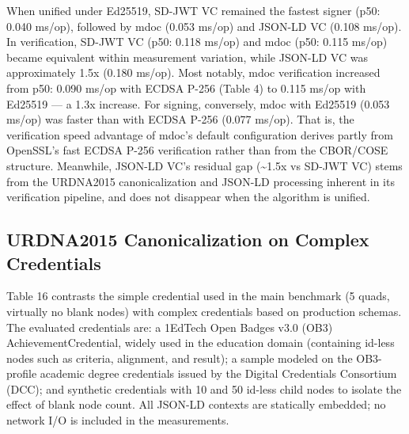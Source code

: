 \documentclass[conference]{IEEEtran}
\begin{document}
\begin{table}[!t]
\centering
\caption{Table 15. Ed25519-Unified Benchmark (all formats with same algorithm and attribute count; medians across N=2,000 $\times$ 5 runs)}\label{tab:15}
\footnotesize
{}
\end{table}

When unified under Ed25519, SD-JWT VC remained the fastest signer (p50: 0.040 ms/op), followed by mdoc (0.053 ms/op) and JSON-LD VC (0.108 ms/op). In verification, SD-JWT VC (p50: 0.118 ms/op) and mdoc (p50: 0.115 ms/op) became equivalent within measurement variation, while JSON-LD VC was approximately 1.5x (0.180 ms/op). Most notably, mdoc verification increased from p50: 0.090 ms/op with ECDSA P-256 (Table 4) to 0.115 ms/op with Ed25519 --- a 1.3x increase. For signing, conversely, mdoc with Ed25519 (0.053 ms/op) was faster than with ECDSA P-256 (0.077 ms/op). That is, the verification speed advantage of mdoc's default configuration derives partly from OpenSSL's fast ECDSA P-256 verification rather than from the CBOR/COSE structure. Meanwhile, JSON-LD VC's residual gap (\textasciitilde1.5x vs SD-JWT VC) stems from the URDNA2015 canonicalization and JSON-LD processing inherent in its verification pipeline, and does not disappear when the algorithm is unified.

\subsection{URDNA2015 Canonicalization on Complex Credentials}

Table 16 contrasts the simple credential used in the main benchmark (5 quads, virtually no blank nodes) with complex credentials based on production schemas. The evaluated credentials are: a 1EdTech Open Badges v3.0 (OB3) AchievementCredential, widely used in the education domain (containing id-less nodes such as criteria, alignment, and result); a sample modeled on the OB3-profile academic degree credentials issued by the Digital Credentials Consortium (DCC); and synthetic credentials with 10 and 50 id-less child nodes to isolate the effect of blank node count. All JSON-LD contexts are statically embedded; no network I/O is included in the measurements.
\end{document}
